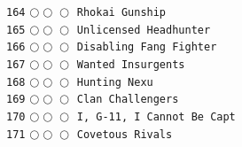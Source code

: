 \documentclass[a4paper,landscape]{article}
\begin{document}
\begin{multicols*}{5}
\texttt{164} \(\bigcirc\!\bigcirc\!\bigcirc\)  \texttt{Rhokai Gunship} \vspace{-0.3mm}\\ 
\texttt{165} \(\bigcirc\!\bigcirc\!\bigcirc\)  \texttt{Unlicensed Headhunter} \vspace{-0.3mm}\\ 
\texttt{166} \(\bigcirc\!\bigcirc\!\bigcirc\)  \texttt{Disabling Fang Fighter} \vspace{-0.3mm}\\ 
\texttt{167} \(\bigcirc\!\bigcirc\!\bigcirc\)  \texttt{Wanted Insurgents} \vspace{-0.3mm}\\ 
\texttt{168} \(\bigcirc\!\bigcirc\!\bigcirc\)  \texttt{Hunting Nexu} \vspace{-0.3mm}\\ 
\texttt{169} \(\bigcirc\!\bigcirc\!\bigcirc\)  \texttt{Clan Challengers} \vspace{-0.3mm}\\ 
\texttt{170} \(\bigcirc\!\bigcirc\!\bigcirc\)  \texttt{I, G-11, I Cannot Be Capt} \vspace{-0.3mm}\\ 
\texttt{171} \(\bigcirc\!\bigcirc\!\bigcirc\)  \texttt{Covetous Rivals} \vspace{-0.3mm}\\ 

\end{multicols*}
\end{document}
